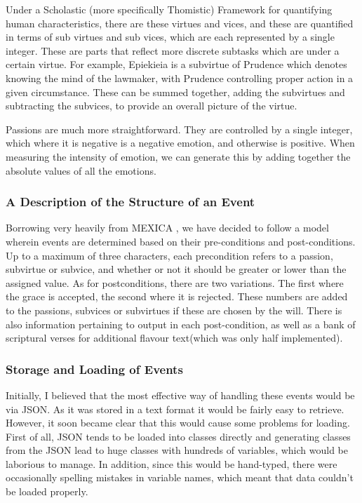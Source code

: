 \documentclass[12pt]{article}
\begin{document}
Under a Scholastic (more specifically Thomistic) Framework for quantifying human characteristics, there are these virtues and vices, and these are quantified in terms of sub virtues and sub vices, which are each represented by a single integer. These are parts that reflect more discrete subtasks which are under a certain virtue. For example, Epiekieia is a subvirtue of Prudence which denotes knowing the mind of the lawmaker, with Prudence controlling proper action in a given circumstance. These can be summed together, adding the subvirtues and subtracting the subvices, to provide an overall picture of the virtue.

Passions are much more straightforward. They are controlled by a single integer, which where it is negative is a negative emotion, and otherwise is positive. When measuring the intensity of emotion, we can generate this by adding together the absolute values of all the emotions.\\

\subsubsection{A Description of the Structure of an Event}
Borrowing very heavily from MEXICA \cite{MEXICA}, we have decided to follow a model wherein events are determined based on their pre-conditions and post-conditions. Up to a maximum of three characters, each precondition refers to a passion, subvirtue or subvice, and whether or not it should be greater or lower than the assigned value. As for postconditions, there are two variations. The first where the grace is accepted, the second where it is rejected. These numbers are added to the passions, subvices or subvirtues if these are chosen by the will. There is also information pertaining to output in each post-condition, as well as a bank of scriptural verses for additional flavour text(which was only half implemented).

\subsubsection{Storage and Loading of Events} 
Initially, I believed that the most effective way of handling these events would be via JSON. As it was stored in a text format it would be fairly easy to retrieve. However, it soon became clear that this would cause some problems for loading. First of all, JSON tends to be loaded into classes directly and generating classes from the JSON lead to huge classes with hundreds of variables, which would be laborious to manage. In addition, since this would be hand-typed, there were occasionally spelling mistakes in variable names, which meant that data couldn't be loaded properly.\\
\end{document}
